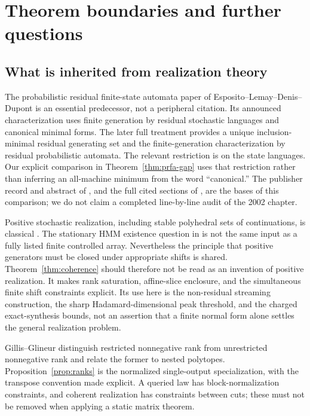 \section{Theorem boundaries and further questions}
\label{sec:literature}
\subsection{What is inherited from realization theory}
The probabilistic residual finite-state automata paper of
Esposito--Lemay--Denis--Dupont \cite{ELDD02} is an essential predecessor,
not a peripheral citation. Its announced characterization uses finite
generation by residual stochastic languages and canonical minimal forms.
The later full treatment \cite[Propositions 16, 19]{DenisEsposito}
provides a unique inclusion-minimal residual generating set and the
finite-generation characterization by residual probabilistic automata.
The relevant restriction is on the state languages. Our explicit
comparison in Theorem~\ref{thm:prfa-gap} uses that restriction rather
than inferring an all-machine minimum from the word ``canonical.''
The publisher record and abstract of \cite{ELDD02}, and the full cited
sections of \cite{DenisEsposito}, are the bases of this comparison;
we do not claim a completed line-by-line audit of the 2002 chapter.

Positive stochastic realization, including stable polyhedral sets of
continuations, is classical \cite{Heller,Vidyasagar}. The stationary
HMM existence question in \cite{Vidyasagar} is not the same input as a
fully listed finite controlled array. Nevertheless the principle that
positive generators must be closed under appropriate shifts is shared.
Theorem~\ref{thm:coherence} should therefore not be read as an invention
of positive realization. It makes rank saturation, affine-slice
enclosure, and the simultaneous finite shift constraints explicit.
Its use here is the non-residual streaming construction, the sharp
Hadamard-dimensional peak threshold, and the charged exact-synthesis
bounds, not an assertion that a finite normal form alone settles the
general realization problem.

Gillis--Glineur \cite[Definition 1 and Theorem 1]{GG} distinguish
restricted nonnegative rank from unrestricted nonnegative rank and
relate the former to nested polytopes. Proposition~\ref{prop:ranks}
is the normalized single-output specialization, with the transpose
convention made explicit. A queried law has block-normalization
constraints, and coherent realization has constraints between cuts;
these must not be removed when applying a static matrix theorem.

